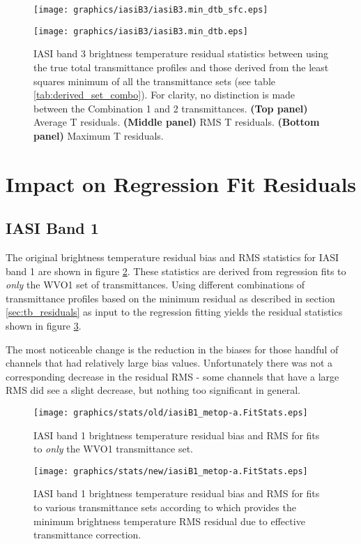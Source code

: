 \begin{figure}[htp]
  \centering
  \texttt{[image: graphics/iasiB3/iasiB3.min\_dtb\_sfc.eps]}
  \caption{IASI band 3 brightness temperature residuals for all view angles and profiles between using the true total transmittance profiles and those derived from the least squares minimum of all the transmittance sets (see table \ref{tab:derived_set_combo})}
  \label{fig:iasiB3.min_dtb_sfc}
  \vspace{1em}
  \texttt{[image: graphics/iasiB3/iasiB3.min\_dtb.eps]}
  \caption{IASI band 3 brightness temperature residual statistics between using the true total transmittance profiles and those derived from the least squares minimum of all the transmittance sets (see table \ref{tab:derived_set_combo}). For clarity, no distinction is made between the Combination 1 and 2 transmittances. \textbf{(Top panel)} Average T residuals. \textbf{(Middle panel)} RMS T residuals. \textbf{(Bottom panel)} Maximum T residuals.}
  \label{fig:iasiB3.min_dtb}
\end{figure}



\section{Impact on Regression Fit Residuals}
\subsection{IASI Band 1}
The original brightness temperature residual bias and RMS statistics for IASI band 1 are shown in figure \ref{fig:old_iasiB1_stats}. These statistics are derived from regression fits to \emph{only} the WVO1 set of transmittances. Using different combinations of transmittance profiles based on the minimum residual as described in section \ref{sec:tb_residuals} as input to the regression fitting yields the residual statistics shown in figure \ref{fig:new_iasiB1_stats}.

The most noticeable change is the reduction in the biases for those handful of channels that had relatively large bias values. Unfortunately there was not a corresponding decrease in the residual RMS - some channels that have a large RMS did see a slight decrease, but nothing too significant in general.
\begin{figure}[htp]
  \centering
  \texttt{[image: graphics/stats/old/iasiB1\_metop-a.FitStats.eps]}
  \caption{IASI band 1 brightness temperature residual bias and RMS for fits to \emph{only} the WVO1 transmittance set.}
  \label{fig:old_iasiB1_stats}
\end{figure}
\begin{figure}[htp]
  \centering
  \texttt{[image: graphics/stats/new/iasiB1\_metop-a.FitStats.eps]}
  \caption{IASI band 1 brightness temperature residual bias and RMS for fits to various transmittance sets according to which provides the minimum brightness temperature RMS residual due to effective transmittance correction.}
  \label{fig:new_iasiB1_stats}
\end{figure}

